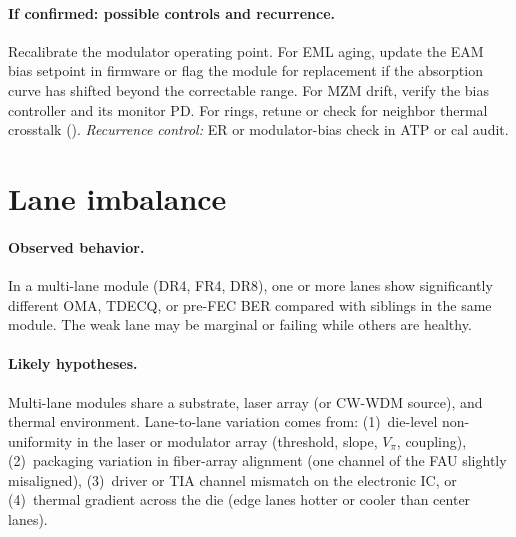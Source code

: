 \paragraph{If confirmed: possible controls and recurrence.}
Recalibrate the modulator operating point. For EML aging, update the EAM bias
setpoint in firmware or flag the module for replacement if the absorption curve has
shifted beyond the correctable range. For MZM drift, verify the bias controller and
its monitor PD. For rings, retune or check for neighbor thermal crosstalk
().
\emph{Recurrence control:} ER or modulator-bias check in ATP or cal audit.

\section{Lane imbalance}
\label{sec:fm-lane-imbalance}

\paragraph{Observed behavior.}
In a multi-lane module (DR4, FR4, DR8), one or more lanes show significantly
different OMA, TDECQ, or pre-FEC BER compared with siblings in the same module.
The weak lane may be marginal or failing while others are healthy.


\paragraph{Likely hypotheses.}
Multi-lane modules share a substrate, laser array (or CW-WDM source), and thermal
environment. Lane-to-lane variation comes from: (1)~die-level non-uniformity in the
laser or modulator array (threshold, slope, $V_\pi$, coupling), (2)~packaging
variation in fiber-array alignment (one channel of the FAU slightly misaligned),
(3)~driver or TIA channel mismatch on the electronic IC, or (4)~thermal gradient
across the die (edge lanes hotter or cooler than center lanes).

